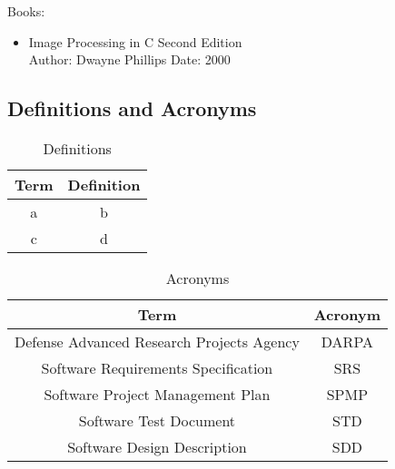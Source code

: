 Books:

\begin{itemize}
  \item Image Processing in C Second Edition\\
        Author: Dwayne Phillips
        Date: 2000
\end{itemize}

\subsection{Definitions and Acronyms}
\begin{table}[H]
\begin{tabular}{|c|c|}
  \hline
  Term & Definition \\
   \hline
  a & b \\
   \hline
  c & d \\
   \hline
  \hline
\end{tabular}
\caption{Definitions}
\end{table}

\begin{table}[H]
\begin{tabular}{|c|c|}
  \hline
  Term & Acronym \\
   \hline
  Defense Advanced Research Projects Agency  & DARPA \\
   \hline
  Software Requirements Specification & SRS \\
   \hline
    Software Project Management Plan & SPMP \\
   \hline
     Software Test Document & STD \\
   \hline
     Software Design Description & SDD \\
   \hline
\end{tabular}
\caption{Acronyms}
\end{table}


